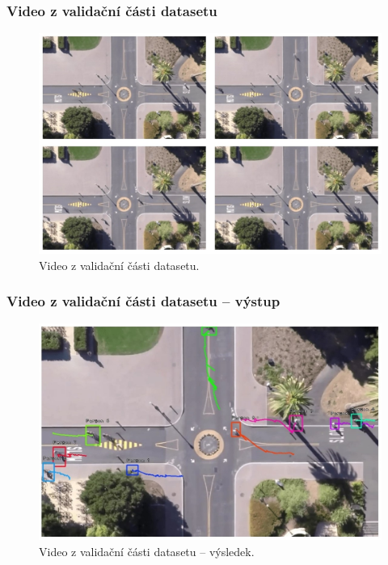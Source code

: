 \documentclass[11pt,xcolor=pdflatex]{beamer}
\begin{document}
\begin{frame}\frametitle{Video z validační části datasetu}
    
    \begin{figure}[H]
        \centering
        \includegraphics[width=.99\linewidth]{images/test1-input.jpg}
        \caption{Video z validační části datasetu.}
    \end{figure}
    
\end{frame}


\begin{frame}\frametitle{Video z validační části datasetu -- výstup}
    
    \begin{figure}[H]
        \centering
        \includegraphics[width=.99\linewidth]{images/test1-output.jpg}
        \caption{Video z validační části datasetu -- výsledek.}
    \end{figure}
    
\end{frame}
\end{document}
